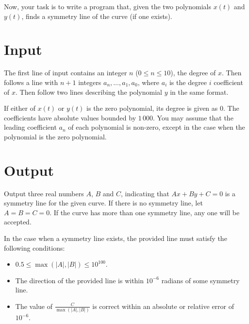 \noindent
Now, your task is to write a program that, given the two polynomials $x(t)$
and $y(t)$, finds a symmetry line of the curve (if one exists).

\section*{Input}

The first line of input contains an integer $n$ ($0 \le n \le 10$), the
degree of $x$.  Then follows a line with $n+1$ integers $a_n, \ldots,
a_1, a_0$, where $a_i$ is the degree $i$ coefficient of $x$.  Then
follow two lines describing the polynomial $y$ in the same format.

If either of $x(t)$ or $y(t)$ is the zero polynomial, its degree is
given as $0$.  The coefficients have absolute values bounded by
$1\,000$.  You may assume that the leading coefficient $a_n$ of each
polynomial is non-zero, except in the case when the polynomial is the
zero polynomial.

\section*{Output}

Output three real numbers $A$, $B$ and $C$, indicating that $Ax + By + C =
0$ is a symmetry line for the given curve.  If there is no symmetry
line, let $A = B = C = 0$.  If the curve has more than one symmetry line,
any one will be accepted.

In the case when a symmetry line exists, the provided line must satisfy the following conditions:
\begin{itemize}
\item $0.5 \le \max(|A|, |B|) \le 10^{100}$.
\item The direction of the provided line is within $10^{-6}$ radians of some symmetry line.
\item The value of $\frac{C}{\max(|A|, |B|)}$ is correct within an absolute or relative error of $10^{-6}$.
\end{itemize}

